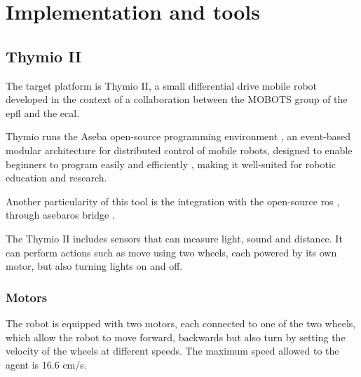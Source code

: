 \chapter{Implementation and tools}
\label{chap:impl}

\section{Thymio II}
\label{sec:thymio}

The target platform is Thymio II, a small differential drive mobile robot developed 
in the context of a collaboration between the MOBOTS group of the \gls{epfl} and 
the \gls{ecal}. 

Thymio runs the Aseba open-source programming environment 
\cite[see][]{magnenat2010aseba}, an event-based modular architecture for 
distributed control of mobile robots, designed to enable beginners to program 
easily and efficiently \cite[][]{mondada2017bringing}, making it well-suited for 
robotic education and research.

Another particularity of this tool is the integration with the open-source 
\gls{ros} \cite[][]{quigley2009ros}, through asebaros bridge \cite[][]{asebaros}. 

The Thymio II includes sensors that can measure light, sound and distance. It can 
perform actions such as move using two wheels, each powered by its own motor, 
but also turning lights on and off.

\subsection{Motors}
\label{subsection: motors}
The robot is equipped with two motors, each connected to one of the two 
wheels, which allow the robot to move forward, backwards but also turn by 
setting the velocity of the wheels at different speeds. The maximum speed allowed 
to the agent is $16.6$ \gls{cm/s}.

